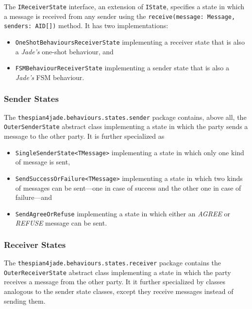 The \texttt{IReceiverState} interface, an extension of \texttt{IState}, specifies a state in which a message is received from any sender using the \texttt{receive(message: Message, senders: AID[])} method.
It has two implementations:
\begin{itemize}
	\item \texttt{OneShotBehavioursReceiverState} implementing a receiver state that is also a \textit{Jade's} one-shot behaviour, and
	\item \texttt{FSMBehaviourReceiverState} implementing a sender state that is also a \textit{Jade's} FSM behaviour.
\end{itemize}

\subsubsection*{Sender States}

The \texttt{thespian4jade.behaviours.states.sender} package contains, above all, the \texttt{OuterSenderState} abstract class implementing a state in which the party sends a message to the other party.
It is further specialized as
\begin{itemize}
	\item \texttt{SingleSenderState<TMessage>} implementing a state in which only one kind of message is sent,
	\item \texttt{SendSuccessOrFailure<TMessage>} implementing a state in which two kinds of messages can be sent---one in case of success and the other one in case of failure---and 
	\item \texttt{SendAgreeOrRefuse} implementing a state in which either an \textit{AGREE} or \textit{REFUSE} message can be sent.
\end{itemize}

\subsubsection*{Receiver States}

The \texttt{thespian4jade.behaviours.states.receiver} package contains the \texttt{OuterReceiverState} abstract class implementing a state in which the party receives a message from the other party.
It it further specialized by classes analogous to the sender state classes, except they receive messages instead of sending them.

